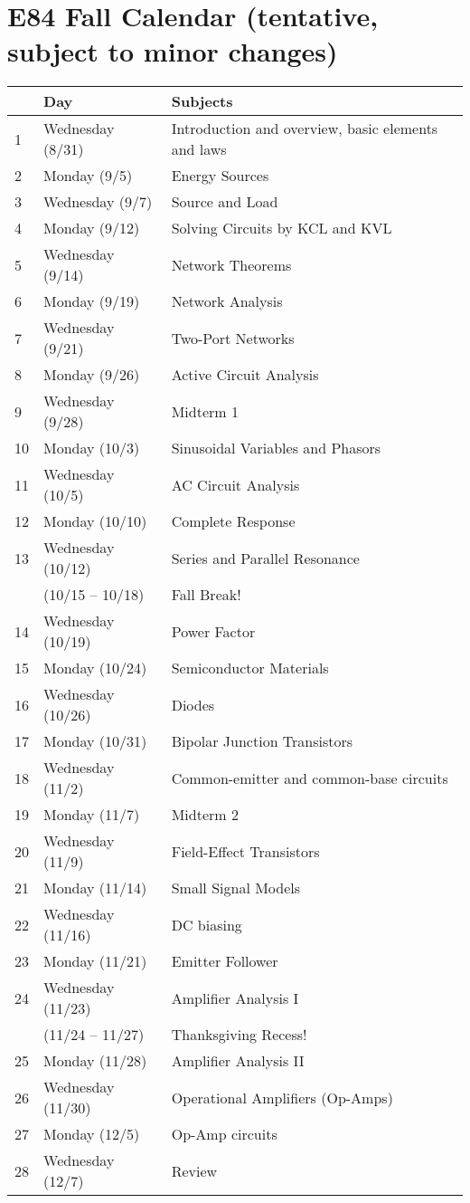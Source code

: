 \usepackage{html}
\textwidth 6.0in
\topmargin -0.5in
\oddsidemargin -0in
\evensidemargin -0.5in


\section*{E84 Fall Calendar (tentative, subject to minor changes)}

\begin{tabular}{l|l|l}\hline
  & {\bf Day} & {\bf Subjects} \\ \hline
1 & Wednesday (8/31) & Introduction and overview, basic elements and laws \\
2 & Monday (9/5) & Energy Sources \\
3 & Wednesday (9/7) & Source and Load \\
4 & Monday (9/12) & Solving Circuits by KCL and KVL \\
5 & Wednesday (9/14) & Network Theorems \\
6 & Monday (9/19) & Network Analysis \\
7 & Wednesday (9/21) & Two-Port Networks  \\
8 & Monday (9/26) & Active Circuit Analysis \\
9 & Wednesday (9/28) & Midterm 1 \\
10& Monday (10/3) & Sinusoidal Variables and Phasors \\
11& Wednesday (10/5) & AC Circuit Analysis \\
12& Monday (10/10) & Complete Response \\
13& Wednesday (10/12) & Series and Parallel Resonance \\
  & (10/15 -- 10/18) & Fall Break! \\
14& Wednesday (10/19) & Power Factor \\
15& Monday (10/24) & Semiconductor Materials \\
16& Wednesday (10/26) & Diodes \\ 
17& Monday (10/31) & Bipolar Junction Transistors \\
18& Wednesday (11/2) & Common-emitter and common-base circuits\\
19& Monday (11/7) & Midterm 2 \\
20& Wednesday (11/9) & Field-Effect Transistors \\
21& Monday (11/14) & Small Signal Models \\
22& Wednesday (11/16) & DC biasing \\ 
23& Monday (11/21) & Emitter Follower \\
24& Wednesday (11/23) & Amplifier Analysis I \\
  & (11/24 -- 11/27) & Thanksgiving Recess! \\
25& Monday (11/28) & Amplifier Analysis II \\
26& Wednesday (11/30) & Operational Amplifiers (Op-Amps)\\
27& Monday (12/5) & Op-Amp circuits \\
28& Wednesday (12/7) & Review \\
\end{tabular}



